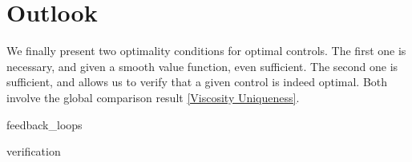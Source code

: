 \chapter*{Outlook}

We finally present two optimality conditions for optimal controls. The first one is necessary, and given a smooth value function, even sufficient. The second one is sufficient, and allows us to verify that a given control is indeed optimal. Both involve the global comparison result \ref{Viscosity Uniqueness}.

{feedback_loops}

{verification}